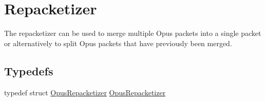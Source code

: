 \hypertarget{group__opus__repacketizer}{}\section{Repacketizer}
\label{group__opus__repacketizer}


The repacketizer can be used to merge multiple Opus packets into a single packet or alternatively to split Opus packets that have previously been merged.  


\subsection*{Typedefs}
\begin{DoxyCompactItemize}
\item 
typedef struct \hyperlink{group__opus__repacketizer_ga1f85070a64bcbf5bf24f5ccb80323e7b}{Opus\+Repacketizer} \hyperlink{group__opus__repacketizer_ga1f85070a64bcbf5bf24f5ccb80323e7b}{Opus\+Repacketizer}
\end{DoxyCompactItemize}
